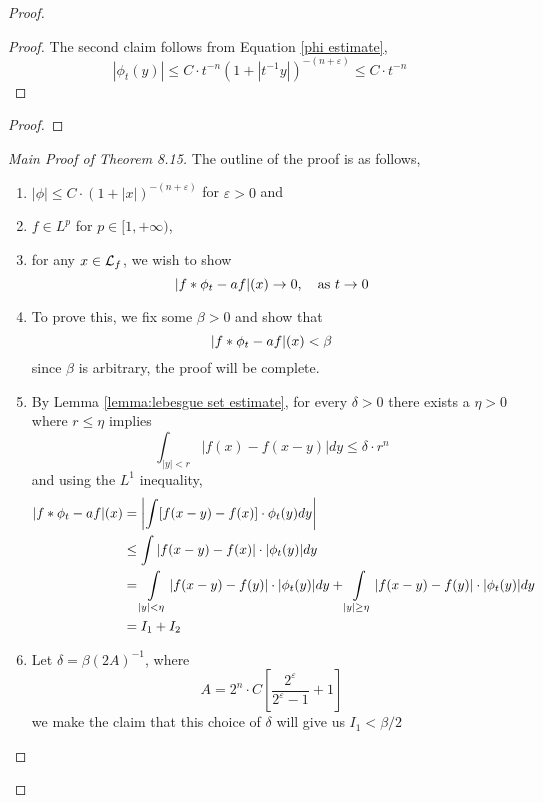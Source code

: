 \documentclass[../../main.tex]{subfiles}
\begin{document}
\begin{proof}
\begin{proof}
    The second claim follows from Equation \eqref{phi estimate}, \[|\phi_t(y)|\leq C\cdot t^{-n}(1+|t^{-1}y|)^{-(n+\varepsilon)}\leq C\cdot t^{-n}\]
\end{proof}

\begin{lemma}
    
\end{lemma}

\begin{proof}
\end{proof}


\begin{proof}[Main Proof of Theorem 8.15]
    The outline of the proof is as follows,
    \begin{enumerate}
        \item $|\phi|\leq C\cdot (1+|x|)^{-(n+\varepsilon)}$ for $\varepsilon>0$ and
        
        \item $f\in L^p$ for $p\in[1,+\infty)$,
        
        \item for any $x\in\mathcal{L}_f$, we wish to show \[|f\ast\phi_t - af|(x)\to 0,\quad\text{as }t \to 0\]
        
        \item To prove this, we fix some $\beta>0$ and show that\[|f\ast\phi_t - af|(x)<\beta\]
        since $\beta$ is arbitrary, the proof will be complete.

        \item By Lemma \ref{lemma:lebesgue set estimate}, for every $\delta>0$ there exists a $\eta>0$ where $r\leq \eta$ implies
        \[\int_{|y|<r}|f(x)-f(x-y)|dy\leq\delta\cdot r^n\] and using the $L^1$ inequality,
        \begin{align*}|f\ast\phi_t-af|(x)&=\left|\int [f(x-y)-f(x)]\cdot\phi_t(y)dy\right|\\
        &\leq\int |f(x-y)-f(x)|\cdot|\phi_t(y)|dy\\
        &=\int\limits_{|y|<\eta} |f(x-y)-f(y)|\cdot|\phi_t(y)|dy + \int\limits_{|y|\geq\eta} |f(x-y)-f(y)|\cdot|\phi_t(y)|dy\\
        &=I_1 +I_2
        \end{align*}
        
        \item Let $\delta = \beta(2A)^{-1}$, where 
        \[A = 2^n\cdot C\left[\dfrac{2^\varepsilon}{2^\varepsilon-1}+1\right]\]
        we make the claim that this choice of $\delta$ will give us $I_1<\beta/2$
        

\end{enumerate}
\end{proof}
\end{proof}
\end{document}

